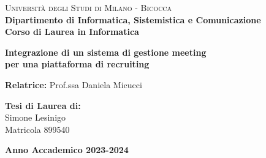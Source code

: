 \begin{titlepage}
    
    \noindent
    \begin{minipage}[t]{0.19\textwidth}
    \end{minipage}
    \hspace{2mm}
    \begin{minipage}[t]{0.95\textwidth}
    {
            {\textsc{Università degli Studi di Milano - Bicocca}} \\
            \textbf{Dipartimento di Informatica, Sistemistica e Comunicazione} \\
            \textbf{Corso di Laurea in Informatica} \\
            \par
    }
    \end{minipage}
    
\vspace{40mm}
    
\begin{center}
    \begin{adjustbox}{max width=1.2\textwidth,center}
        \begin{minipage}{1.2\textwidth}
            \centering
            {\LARGE{
                \textbf{Integrazione di un sistema di gestione meeting} \\
                \textbf{per una piattaforma di recruiting}
            }}
        \end{minipage}
    \end{adjustbox}
\end{center}
    
    \vspace{50mm}

    \noindent
    {\large \textbf{Relatrice:} Prof.ssa Daniela Micucci} \\
    
    \vspace{15mm}

    \begin{flushright}
        {\large \textbf{Tesi di Laurea di:}} \\
        \large{Simone Lesinigo} \\
        \large{Matricola 899540} 
    \end{flushright}
    
    \vspace{20mm}
    \begin{center}
        {\large{\bf Anno Accademico 2023-2024}}
    \end{center}

    
\end{titlepage}

